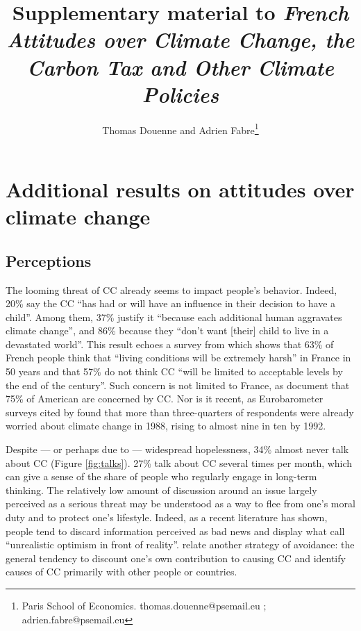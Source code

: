 \documentclass[11pt]{article}
\date{}
\title{Supplementary material to \textit{French Attitudes over Climate Change, the Carbon Tax and Other Climate Policies}}
\author{Thomas Douenne and Adrien Fabre\footnote{Paris School of Economics.  thomas.douenne@psemail.eu ; adrien.fabre@psemail.eu}}
\begin{document}
\maketitle


  



\setcounter{tocdepth}{1}
\tableofcontents




\section{Additional results on attitudes over climate change}
    

      \subsection{Perceptions\label{subsec:opinions}
      }

The looming threat of CC already seems to impact people's behavior. Indeed, 20\% say the CC ``has had or will have an influence in their decision to have a child''. Among them, 37\% justify it ``because each additional human aggravates climate change'', and 86\% because they ``don't want [their] child to live in a devastated world''. This result echoes a survey from \citet{ademe_representations_2018} which shows that 63\% of French people think that ``living conditions will be extremely harsh'' in France in 50 years and that 57\% do not think CC ``will be limited to acceptable levels by the end of the century''. Such concern is not limited to France, as \citet{funk_politics_2016} document that 75\% of American are concerned by CC. Nor is it recent, as Eurobarometer surveys cited by \citet{whitmarsh_2_2018} found that more than three-quarters of respondents were already worried about climate change in 1988, rising to almost nine in ten by 1992.

Despite --- or perhaps due to --- widespread hopelessness, 34\% almost never talk about CC (Figure \ref{fig:talks}). 27\% talk about CC several times per month, which can give a sense of the share of people who regularly engage in long-term thinking. The relatively low amount of discussion around an issue largely perceived as a serious threat may be understood as a way to flee from one's moral duty and to protect one's lifestyle. Indeed, as a recent literature has shown, people tend to discard information perceived as bad news and display what \citet{sharot_et_al_2011} call ``unrealistic optimism in front of reality''. \citet{whitmarsh_2_2018} relate another strategy of avoidance: the general tendency to discount one’s own contribution to causing CC and identify causes of CC primarily with other people or countries. %
\end{document}
